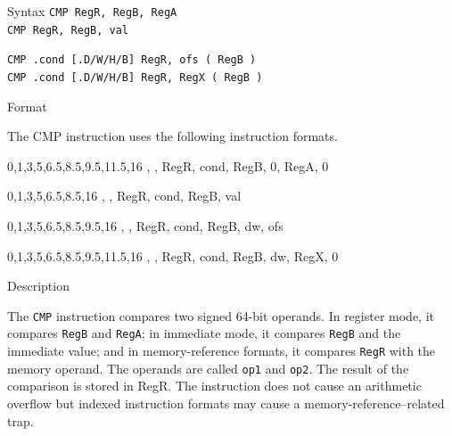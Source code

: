 %
%
\pagebreak
{}

\begin{iPageDescEntry}{Syntax} 
  \texttt{CMP RegR, RegB, RegA} \\
  \texttt{CMP RegR, RegB, val}
  
  \texttt{CMP .cond [.D/W/H/B] RegR, ofs ( RegB )} \\
  \texttt{CMP .cond [.D/W/H/B] RegR, RegX ( RegB )}
\end{iPageDescEntry}

\begin{iPageDescEntry}{Format}

The CMP instruction uses the following instruction formats. \\
	
\begin{flushleft}	

	\drawInstrFormat
  	{0,1,3,5,6.5,8.5,9.5,11.5,16}
  	{\OpCodeGrpALU, \OpCodeCMPA, RegR, cond, RegB, 0, RegA, 0}
	
	\drawInstrFormat
  	{0,1,3,5,6.5,8.5,16}
  	{\OpCodeGrpALU, \OpCodeCMPB, RegR, cond, RegB, val}

	\drawInstrFormat
  	{0,1,3,5,6.5,8.5,9.5,16}
  	{\OpCodeGrpMEM, \OpCodeCMPA, RegR, cond, RegB, dw, ofs}
 
	\drawInstrFormat
  	{0,1,3,5,6.5,8.5,9.5,11.5,16}
  	{\OpCodeGrpMEM, \OpCodeCMPB, RegR, cond, RegB, dw, RegX, 0}

\end{flushleft}  

\end{iPageDescEntry}

\begin{iPageDescEntry}{Description}

The \texttt{CMP} instruction compares two signed 64-bit operands. In register mode, it compares \texttt{RegB} and \texttt{RegA}; in immediate mode, it compares \texttt{RegB} and the immediate value; and in memory-reference formats, it compares \texttt{RegR} with the memory operand. The operands are called \texttt{op1} and \texttt{op2}. The result of the comparison is stored in RegR. The instruction does not cause an arithmetic overflow but indexed instruction formats may cause a memory-reference–related trap.
\end{iPageDescEntry}

